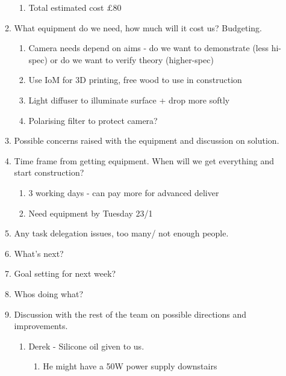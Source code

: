 \begin{enumerate}
\begin{enumerate}
\begin{enumerate}
\item  Total estimated cost $\mathsterling$80
\end{enumerate}

\item  What equipment do we need, how much will it cost us? Budgeting.

\begin{enumerate}
\item  Camera needs depend on aims - do we want to demonstrate (less hi-spec) or do we want to verify theory (higher-spec)

\item  Use IoM for 3D printing, free wood to use in construction

\item  Light diffuser to illuminate surface + drop more softly

\item  Polarising filter to protect camera?
\end{enumerate}

\item  Possible concerns raised with the equipment and discussion on solution. 

\item  Time frame from getting equipment. When will we get everything and start construction?

\begin{enumerate}
\item  3 working days - can pay more for advanced deliver 

\item  Need equipment by Tuesday 23/1
\end{enumerate}

\item  Any task delegation issues, too many/ not enough people. 

\item  What's next? 

\item  Goal setting for next week? 

\item  Whos doing what? 

\item  Discussion with the rest of the team on possible directions and improvements. 

\begin{enumerate}
\item  Derek - Silicone oil given to us.

\begin{enumerate}
\item  He might have a 50W power supply downstairs


\end{enumerate}
\end{enumerate}
\end{enumerate}
\end{enumerate}
